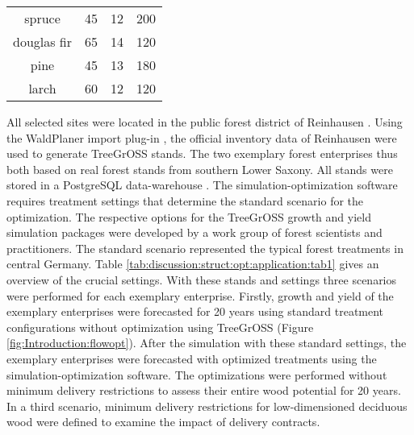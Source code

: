 \begin{table}[h]
\begin{tabular}{cccc}
		spruce        & 45                                                                 & 12                                                                                  & 200                                                                                \\
		douglas fir     & 65                                                                 & 14                                                                                  & 120                                                                                \\
		pine        & 45                                                                 & 13                                                                                  & 180                                                                                \\
		larch        & 60                                                                 & 12                                                                                  & 120                                                                                \\ \hline
	\end{tabular}
\end{table}

All selected sites were located in the public forest district of Reinhausen \citep{nlf_2017}. Using the WaldPlaner import plug-in \citep[p. 58]{hansen_2014}, the official inventory data of Reinhausen were used to generate TreeGrOSS stands. The two exemplary forest enterprises thus both based on real forest stands from southern Lower Saxony. All stands were stored in a PostgreSQL data-warehouse \citep{eisentraut_2003}. The si\-mu\-la\-tion-op\-ti\-mi\-za\-tion software requires treatment settings that determine the standard scenario for the optimization. The respective options for the TreeGrOSS growth and yield simulation packages were developed by a work group of forest scientists and practitioners. The standard scenario represented the typical forest treatments in central Germany. Table \ref{tab:discussion:struct:opt:application:tab1} gives an overview of the crucial settings. With these stands and settings three scenarios were performed for each exemplary enterprise. Firstly, growth and yield of the exemplary enterprises were forecasted for 20 years using standard treatment configurations without optimization using TreeGrOSS (Figure \ref{fig:Introduction:flowopt}). After the simulation with these standard settings, the exemplary enterprises were forecasted with optimized treatments using the si\-mu\-la\-tion-op\-ti\-mi\-za\-tion software. The optimizations were  performed without minimum delivery restrictions to assess their entire wood potential for 20 years. In a third scenario, minimum delivery restrictions for low-dimensioned deciduous wood were defined to examine the impact of delivery contracts.

